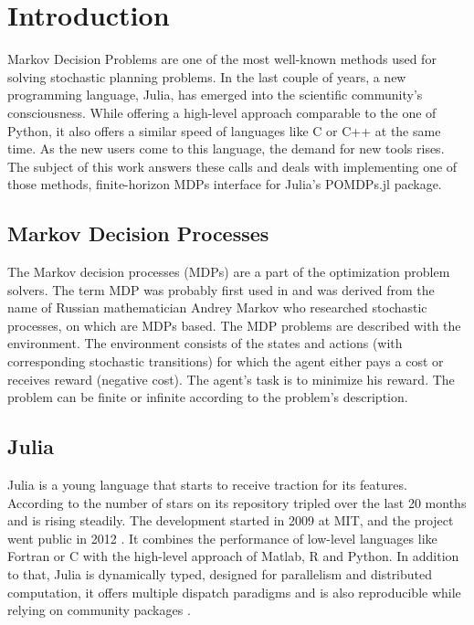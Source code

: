 
\chapter{Introduction}

Markov Decision Problems are one of the most well-known methods used for solving stochastic planning problems. In the last couple of years, a new programming language, Julia, has emerged into the scientific community's consciousness. While offering a high-level approach comparable to the one of Python, it also offers a similar speed of languages like C or C++ at the same time. As the new users come to this language, the demand for new tools rises. The subject of this work answers these calls and deals with implementing one of those methods, finite-horizon MDPs interface for Julia's POMDPs.jl package.

\section{Markov Decision Processes}
The Markov decision processes (MDPs) are a part of the optimization problem solvers.
The term MDP was probably first used in \cite{cite:1} and was derived from the name of Russian mathematician Andrey Markov who researched stochastic processes, on which are MDPs based.
The MDP problems are described with the environment. The environment consists of the states and actions (with corresponding stochastic transitions) for which the agent either pays a cost or receives reward (negative cost). The agent's task is to minimize his reward. The problem can be finite or infinite according to the problem's description.

\section{Julia}
Julia is a young language that starts to receive traction for its features. According to \cite{JuliaStars} the number of stars on its repository \cite{JuliaLang} tripled over the last 20 months and is rising steadily.
The development started in 2009 at MIT, and the project went public in 2012 \cite{JuliaHistory}. 
It combines the performance of low-level languages like Fortran or C with the high-level approach of Matlab, R and Python. In addition to that, Julia is dynamically typed, designed for parallelism and distributed computation, it offers multiple dispatch paradigms and is also reproducible while relying on community packages \cite{JuliaLangorg}.


